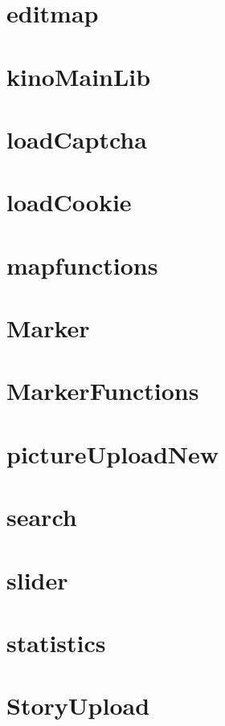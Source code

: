 \section{editmap}

\newpage
\section{kinoMainLib}

\newpage
\section{loadCaptcha}

\newpage
\section{loadCookie}

\newpage
\section{mapfunctions}

\newpage
\section{Marker}

\newpage
\section{MarkerFunctions}

\newpage
\section{pictureUploadNew}

\newpage
\section{search}

\newpage
\section{slider}

\newpage
\section{statistics}

\newpage
\section{StoryUpload}

\newpage
